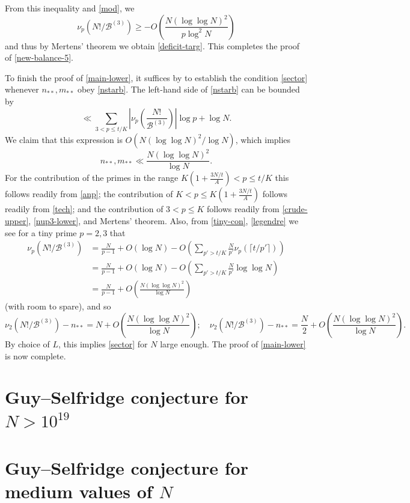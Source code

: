 \documentclass[12pt,a4paper,reqno]{amsart}
\numberwithin{equation}{section}
\theoremstyle{plain}
\theoremstyle{definition}
\newcommand\tuple{{\mathcal B}}
\begin{document}
From this inequality and \eqref{mod}, we
\begin{equation}\label{nup3-lower} 
\nu_p(N!/\tuple^{(3)}) \geq - O\left( \frac{N(\log\log N)^2}{p \log^2 N} \right)
\end{equation}
and thus by Mertens' theorem we obtain \eqref{deficit-targ}.  This completes the proof of \eqref{new-balance-5}.

To finish the proof of \eqref{main-lower}, it suffices by  to establish the condition \eqref{sector} whenever $n_{**}, m_{**}$ obey \eqref{nstarb}.  The left-hand side of \eqref{nstarb} can be bounded by
$$ \ll \sum_{3 < p \leq t/K} \left| \nu_p\left(\frac{N!}{\tuple^{(3)}}\right) \right|\log p + \log N.$$
We claim that this expression is $O( N (\log\log N)^2 / \log N )$, which implies
$$ n_{**}, m_{**} \ll \frac{N (\log\log N)^2}{\log N}.$$
For the contribution of the primes in the range $K(1+\frac{3N/t}{A}) < p \leq t/K$ this follows readily from \eqref{anp}; the contribution of $K < p \leq K(1+\frac{3N/t}{A})$ follows readily from \eqref{tech}; and the contribution of $3 < p \leq K$ follows readily from \eqref{crude-upper}, \eqref{nup3-lower}, and Mertens' theorem.  Also, from \eqref{tiny-con}, \eqref{legendre} we see for a tiny prime $p=2,3$ that
\begin{align*}
  \nu_p(N!/\tuple^{(3)}) &= \frac{N}{p-1} + O(\log N) -
O\left( \sum_{p' > t/K} \frac{N}{p'} \nu_{p}(\lceil t/p' \rceil) \right) \\
&= \frac{N}{p-1} + O(\log N)
- O\left( \sum_{p' > t/K} \frac{N}{p'} \log \log N \right)\\
&= \frac{N}{p-1} + O\left( \frac{N (\log\log N)^2}{\log N} \right)
\end{align*}
(with room to spare), and so
$$   \nu_2(N!/\tuple^{(3)}) - n_{**} = N + O\left( \frac{N (\log\log N)^2}{\log N} \right); \quad 
\nu_2(N!/\tuple^{(3)}) - n_{**} = \frac{N}{2} + O\left( \frac{N (\log\log N)^2}{\log N} \right).$$
By choice of $L$, this implies \eqref{sector} for $N$ large enough.  The proof of \eqref{main-lower} is now complete.

\section{Guy--Selfridge conjecture for $N > 10^{19}$}


\section{Guy--Selfridge conjecture for medium values of $N$}
\end{document}
